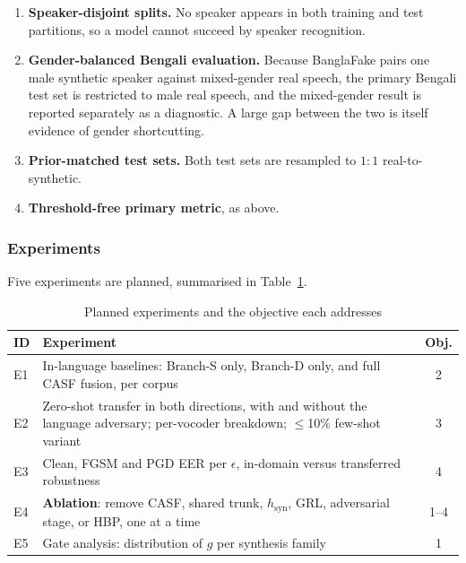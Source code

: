 \documentclass[conference]{IEEEtran}
\begin{document}
\begin{enumerate}
\item \textbf{Speaker-disjoint splits.} No speaker appears in both training
      and test partitions, so a model cannot succeed by speaker recognition.
\item \textbf{Gender-balanced Bengali evaluation.} Because BanglaFake pairs
      one male synthetic speaker against mixed-gender real speech, the primary
      Bengali test set is restricted to male real speech, and the
      mixed-gender result is reported separately as a diagnostic. A large gap
      between the two is itself evidence of gender shortcutting.
\item \textbf{Prior-matched test sets.} Both test sets are resampled to
      $1{:}1$ real-to-synthetic.
\item \textbf{Threshold-free primary metric}, as above.
\end{enumerate}

\subsubsection{Experiments}
Five experiments are planned, summarised in Table~\ref{tab:experiments}.

\begin{table}[!t]
\caption{Planned experiments and the objective each addresses}
\label{tab:experiments}
\centering
\renewcommand{\arraystretch}{1.2}
\begin{tabularx}{\columnwidth}{@{}l >{\raggedright\arraybackslash}X c@{}}
\toprule
\textbf{ID} & \textbf{Experiment} & \textbf{Obj.} \\
\midrule
E1 & In-language baselines: Branch-S only, Branch-D only, and full CASF
     fusion, per corpus & 2 \\
E2 & Zero-shot transfer in both directions, with and without the language
     adversary; per-vocoder breakdown; $\leq$10\% few-shot variant & 3 \\
E3 & Clean, FGSM and PGD EER per $\epsilon$, in-domain versus transferred
     robustness & 4 \\
E4 & \textbf{Ablation}: remove CASF, shared trunk, $h_{\mathrm{syn}}$, GRL,
     adversarial stage, or HBP, one at a time & 1--4 \\
E5 & Gate analysis: distribution of $g$ per synthesis family & 1 \\
\bottomrule
\end{tabularx}
\end{table}
\end{document}
